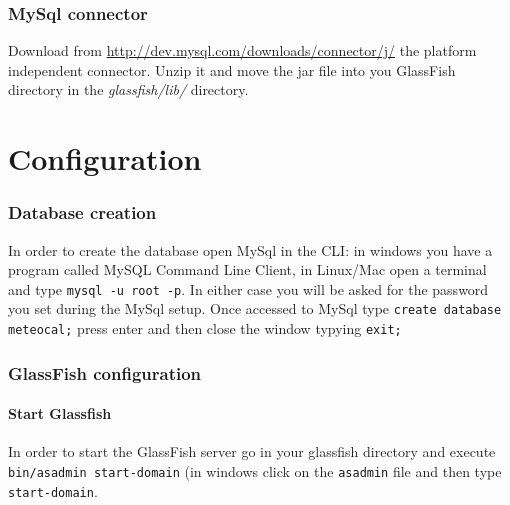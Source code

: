 \documentclass[10pt,a4paper,titlepage]{article}
\begin{document}
\section{MySql connector}
Download from \url{http://dev.mysql.com/downloads/connector/j/} the platform independent connector. Unzip it and move the jar file into you GlassFish directory in the \emph{glassfish/lib/} directory.

\pagebreak
\part{Configuration}

\section{Database creation}
In order to create the database open MySql in the CLI: in windows you have a program called MySQL Command Line Client, in Linux/Mac open a terminal and type \texttt{mysql -u root -p}. In either case you will be asked for the password you set during the MySql setup. Once accessed to MySql type \texttt{create database meteocal;} press enter and then close the window typying \texttt{exit;}

\section{GlassFish configuration}
\subsection{Start Glassfish}
In order to start the GlassFish server go in your glassfish directory and execute \texttt{bin/asadmin start-domain} (in windows click on the \texttt{asadmin} file and then type \texttt{start-domain}.
\end{document}
